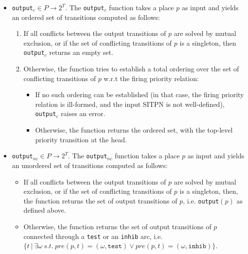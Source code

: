 \begin{itemize}
\item \texttt{output}$_c\in{}P\rightarrow{}2^T$.  The
  \texttt{output}$_c$ function takes a place $p$ as input and yields
  an ordered set of transitions computed as follows:
  \begin{enumerate}
  \item If all conflicts between the output transitions of $p$ are
    solved by mutual exclusion, or if the set of conflicting
    transitions of $p$ is a singleton, then \texttt{output}$_c$
    returns an empty set.
  \item Otherwise, the function tries to establish a total ordering
    over the set of conflicting transitions of $p$ w.r.t the firing
    priority relation:
    \begin{itemize}
    \item If no such ordering can be established (in that case, the
      firing priority relation is ill-formed, and the input SITPN is
      not well-defined), \texttt{output}$_c$ raises an error.
    \item Otherwise, the function returns the ordered set, with the
      top-level priority transition at the head.
    \end{itemize}
  \end{enumerate}

\item \texttt{output}$_{nc}\in{}P\rightarrow{}2^T$.  The
  \texttt{output}$_{nc}$ function takes a place $p$ as input and
  yields an unordered set of transitions computed as follows:
  \begin{itemize}
  \item If all conflicts between the output transitions of $p$ are
    solved by mutual exclusion, or if the set of conflicting
    transitions of $p$ is a singleton, then, the function returns the
    set of output transitions of $p$, i.e. \texttt{output}$(p)$ as
    defined above.
  
  \item Otherwise, the function returns the set of output transitions
    of $p$ connected through a \texttt{test} or an \texttt{inhib} arc,
    i.e.
    $\{t~\vert~\exists\omega~s.t.~pre(p,t)=(\omega,\mathtt{test})\lor{}pre(p,t)=(\omega,\mathtt{inhib})\}$.
  \end{itemize}
\end{itemize}



